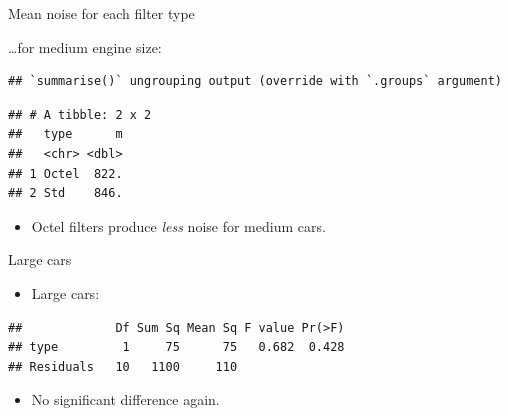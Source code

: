 \documentclass[
  ignorenonframetext,
]{beamer}
\newenvironment{Shaded}{\begin{snugshade}}{\end{snugshade}}
\newcommand{\DataTypeTok}[1]{\textcolor[rgb]{0.13,0.29,0.53}{#1}}
\newcommand{\KeywordTok}[1]{\textcolor[rgb]{0.13,0.29,0.53}{\textbf{#1}}}
\newcommand{\NormalTok}[1]{#1}
\newcommand{\OperatorTok}[1]{\textcolor[rgb]{0.81,0.36,0.00}{\textbf{#1}}}
\newcommand{\StringTok}[1]{\textcolor[rgb]{0.31,0.60,0.02}{#1}}
\providecommand{\tightlist}{%
  \setlength{\itemsep}{0pt}\setlength{\parskip}{0pt}}
\begin{document}
\begin{frame}[fragile]{Mean noise for each filter type}
\protect\hypertarget{mean-noise-for-each-filter-type}{}

\ldots for medium engine size:

\begin{Shaded}
\end{Shaded}

\begin{verbatim}
## `summarise()` ungrouping output (override with `.groups` argument)
\end{verbatim}

\begin{verbatim}
## # A tibble: 2 x 2
##   type      m
##   <chr> <dbl>
## 1 Octel  822.
## 2 Std    846.
\end{verbatim}

\begin{itemize}
\tightlist
\item
  Octel filters produce \emph{less} noise for medium cars.
\end{itemize}

\end{frame}

\begin{frame}[fragile]{Large cars}
\protect\hypertarget{large-cars}{}

\begin{itemize}
\tightlist
\item
  Large cars:
\end{itemize}

\begin{Shaded}
\end{Shaded}

\begin{verbatim}
##             Df Sum Sq Mean Sq F value Pr(>F)
## type         1     75      75   0.682  0.428
## Residuals   10   1100     110
\end{verbatim}

\begin{itemize}
\tightlist
\item
  No significant difference again.
\end{itemize}

\end{frame}
\end{document}
